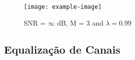 \begin{figure}[!htp]
    \centering
    \texttt{[image: example-image]}
    \caption{SNR = $\infty$ dB, M = 3 and $\lambda = 0.99$}
    \label{fig:L4Q3_a8}
\end{figure}
\clearpage


\subsection{Equalização de Canais} %
    






